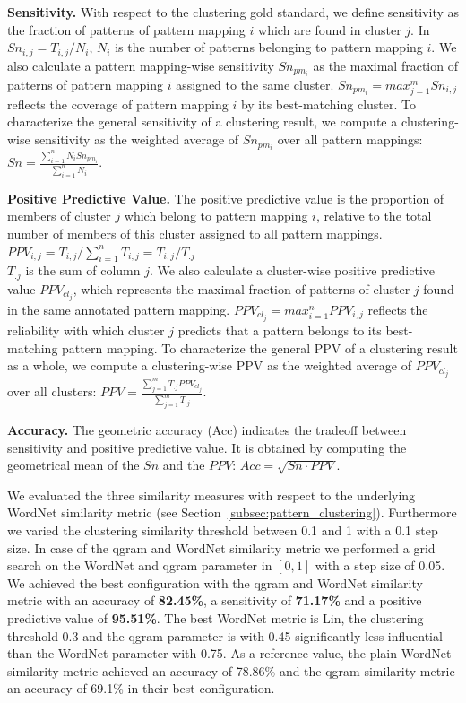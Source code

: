 \documentclass[a4paper]{llncs}
\begin{document}
\textbf{Sensitivity.} With respect to the clustering gold standard, we define sensitivity as the fraction of patterns of pattern mapping $i$ which are found in cluster $j$.
In $Sn_{i,j} = T_{i,j}/N_i$, $N_i$ is the number of patterns belonging to pattern mapping $i$.
We also calculate a pattern mapping-wise sensitivity $Sn_{pm_i}$ as the maximal fraction of patterns of pattern mapping $i$ assigned to the same cluster. 
$Sn_{pm_i} = max^m_{j=1}Sn_{i,j}$ reflects the coverage of pattern mapping $i$ by its best-matching cluster.
To characterize the general sensitivity of a clustering result, we compute a clustering-wise sensitivity as the weighted average of $Sn_{pm_i}$ over all pattern mappings:
$Sn=\frac{\sum_{i=1}^nN_iSn_{pm_i}}{\sum_{i=1}^nN_i}$.

\textbf{Positive Predictive Value.} The positive predictive value is the proportion of members of cluster $j$ which belong to pattern mapping $i$, relative to the total number of members of this cluster assigned to all pattern mappings.
$PPV_{i,j} = T_{i,j} / \sum_{i=1}^n T_{i,j} =T_{i,j} /T_{.j}$ \\
$T_{.j}$ is the sum of column $j$.
We also calculate a cluster-wise positive predictive value $PPV_{cl_j}$, which represents the maximal fraction of patterns of cluster $j$ found in the same annotated pattern mapping.
$PPV_{cl_j} =max^n_{i=1} PPV_{i,j}$ reflects the reliability with which cluster $j$ predicts that a pattern belongs to its best-matching pattern mapping.
To characterize the general PPV of a clustering result as a whole, we compute a clustering-wise PPV as the weighted average of $PPV_{cl_j}$ over all clusters: 
$PPV=\frac{\sum_{j=1}^mT_{.j}PPV_{cl_j}}{\sum_{j=1}^mT_{.j}}$.

\textbf{Accuracy.} The geometric accuracy (Acc) indicates the tradeoff between sensitivity and positive predictive value. It is obtained by computing the geometrical mean of the $Sn$ and the $PPV$:
$Acc= \sqrt{Sn\cdot PPV}$.

We evaluated the three similarity measures with respect to the underlying WordNet similarity metric (see Section~\ref{subsec:pattern_clustering}).
Furthermore we varied the clustering similarity threshold between 0.1 and 1 with a 0.1 step size.
In case of the qgram and WordNet similarity metric we performed a grid search on the WordNet and qgram parameter in $[0,1]$ with a step size of 0.05.
We achieved the best configuration with the qgram and WordNet similarity metric with an accuracy of \textbf{82.45\%}, a sensitivity of \textbf{71.17\%} and a positive predictive value of \textbf{95.51\%}.
The best WordNet metric is Lin, the clustering threshold 0.3 and the qgram parameter is with 0.45 significantly less influential than the WordNet parameter with 0.75.
As a reference value, the plain WordNet similarity metric achieved an accuracy of 78.86\% and the qgram similarity metric an accuracy of 69.1\% in their best configuration.
\end{document}

